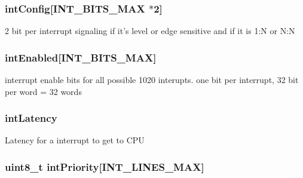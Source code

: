 \label{classPl390_a0158de396428c6145312576a210f1a59}
\hypertarget{classPl390_a0e6a663caacdba2b0b9192c0e2c8c315}{
\subsubsection[{intConfig}]{ {\bf intConfig}\mbox{[}{\bf INT\_\-BITS\_\-MAX} $\ast$2\mbox{]}}}
\label{classPl390_a0e6a663caacdba2b0b9192c0e2c8c315}
2 bit per interrupt signaling if it's level or edge sensitive and if it is 1:N or N:N \hypertarget{classPl390_a1bce6fc9f9b30623d11815ada1bd4f56}{
\subsubsection[{intEnabled}]{ {\bf intEnabled}\mbox{[}{\bf INT\_\-BITS\_\-MAX}\mbox{]}}}
\label{classPl390_a1bce6fc9f9b30623d11815ada1bd4f56}
interrupt enable bits for all possible 1020 interupts. one bit per interrupt, 32 bit per word = 32 words \hypertarget{classPl390_a8acb46f8ecab4551225777951a774a62}{
\subsubsection[{intLatency}]{ {\bf intLatency}}}
\label{classPl390_a8acb46f8ecab4551225777951a774a62}
Latency for a interrupt to get to CPU \hypertarget{classPl390_a4f1f81194c08a716e3583d73588952c2}{
\subsubsection[{intPriority}]{\setlength{\rightskip}{0pt plus 5cm}uint8\_\-t {\bf intPriority}\mbox{[}{\bf INT\_\-LINES\_\-MAX}\mbox{]}}}
\label{classPl390_a4f1f81194c08a716e3583d73588952c2}
